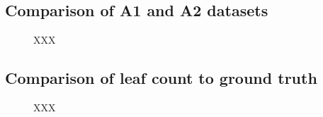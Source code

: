 \documentclass[paper=A4,bibliography=totocnumbered]{scrartcl}
\begin{document}
\subsection{Comparison of A1 and A2 datasets}

\begin{figure}
	\centering
	\qquad
	\caption{XXX}
	\label{fig:A1-A2-size}
\end{figure}

\subsection{Comparison of leaf count to ground truth}

\begin{figure}
	\qquad
	\caption{XXX}
	\label{fig:truth}
\end{figure}
\end{document}
